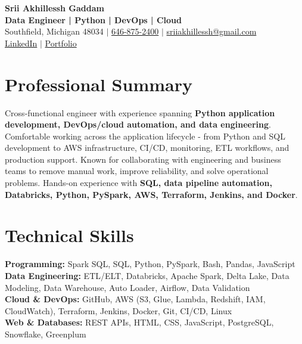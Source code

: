 \documentclass[letterpaper,10pt]{article}
\begin{document}
\fontsize{9.35pt}{10.45pt}\selectfont

\begin{center}
    {\LARGE \textbf{Srii Akhillessh Gaddam}} \\[-1pt]
    \textbf{Data Engineer | Python | DevOps | Cloud} \\[2pt]
    Southfield, Michigan 48034 $|$
    \href{tel:6468752400}{646-875-2400} $|$
    \href{mailto:sriiakhillessh@gmail.com}{sriiakhillessh@gmail.com} \\[1pt]
    \href{https://www.linkedin.com/in/srii-akhiilessh-gaddam-b48668191/}{LinkedIn} $|$
    \href{https://sriiakhillesshg.github.io/portfolio/}{Portfolio}
\end{center}
\vspace{-8pt}

\section{Professional Summary}
\small{Cross-functional engineer with experience spanning \textbf{Python application development, DevOps/cloud automation, and data engineering}. Comfortable working across the application lifecycle - from Python and SQL development to AWS infrastructure, CI/CD, monitoring, ETL workflows, and production support. Known for collaborating with engineering and business teams to remove manual work, improve reliability, and solve operational problems. Hands-on experience with \textbf{SQL, data pipeline automation, Databricks, Python, PySpark, AWS, Terraform, Jenkins, and Docker}.}

\section{Technical Skills}
\small{
\textbf{Programming:} Spark SQL, SQL, Python, PySpark, Bash, Pandas, JavaScript \\
\textbf{Data Engineering:} ETL/ELT, Databricks, Apache Spark, Delta Lake, Data Modeling, Data Warehouse, Auto Loader, Airflow, Data Validation \\
\textbf{Cloud \& DevOps:} GitHub, AWS (S3, Glue, Lambda, Redshift, IAM, CloudWatch), Terraform, Jenkins, Docker, Git, CI/CD, Linux \\
\textbf{Web \& Databases:} REST APIs, HTML, CSS, JavaScript, PostgreSQL, Snowflake, Greenplum
}
\end{document}
